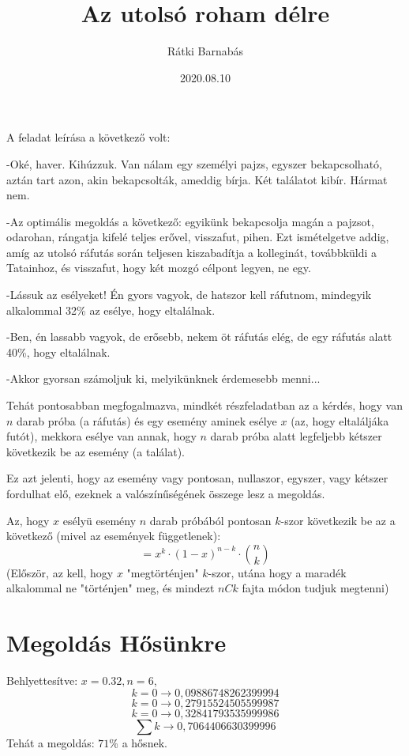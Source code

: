\documentclass{article}[12pt,a4paper]
\title{Az utolsó roham délre}
\author{Rátki Barnabás}
\date{2020.08.10}
\begin{document}
\maketitle

A feladat leírása a következő volt: \begin{displayquote}
-Oké, haver. Kihúzzuk. Van nálam egy személyi pajzs, egyszer bekapcsolható, aztán tart azon, akin bekapcsolták, ameddig bírja. Két találatot kibír. Hármat nem.

-Az optimális megoldás a következő: egyikünk bekapcsolja magán a pajzsot, odarohan, rángatja kifelé teljes erővel, visszafut, pihen. Ezt ismételgetve addig, amíg az utolsó ráfutás során teljesen kiszabadítja a kolleginát, továbbküldi a Tatainhoz, és visszafut, hogy két mozgó célpont legyen, ne egy.

-Lássuk az esélyeket! Én gyors vagyok, de hatszor kell ráfutnom, mindegyik alkalommal 32\% az esélye, hogy eltalálnak.

-Ben, én lassabb vagyok, de erősebb, nekem öt ráfutás elég, de egy ráfutás alatt 40\%, hogy eltalálnak.

-Akkor gyorsan számoljuk ki, melyikünknek érdemesebb menni...
\end{displayquote} 
Tehát pontosabban megfogalmazva, mindkét részfeladatban az a kérdés, hogy van $n$ darab próba (a ráfutás) és egy esemény aminek esélye $x$ (az, hogy eltaláljáka  futót), mekkora esélye van annak, hogy $n$ darab próba alatt legfeljebb kétszer következik be az esemény (a találat).

Ez azt jelenti, hogy az esemény vagy pontosan, nullaszor, egyszer, vagy kétszer fordulhat elő, ezeknek a valószínűségének összege lesz a megoldás.

Az, hogy $x$ esélyü esemény $n$ darab próbából pontosan $k$-szor következik be az a következő (mivel az események függetlenek):
$$ = x^{k} \cdot (1-x)^{n-k} \cdot {n\choose k}$$ (Először, az kell, hogy $x$ "megtörténjen" $k$-szor, utána hogy a maradék alkalommal ne "történjen" meg, és mindezt $nCk$ fajta módon tudjuk megtenni)

\section{Megoldás Hősünkre}
Behlyettesítve: $x=0.32, n=6$,
$$k=0 \rightarrow 0,09886748262399994$$
$$k=0 \rightarrow 0,27915524505599987$$
$$k=0 \rightarrow 0,32841793535999986$$
$$\sum k \rightarrow 0,7064406630399996$$
Tehát a megoldás: $71$\% a hősnek.
\end{document}
